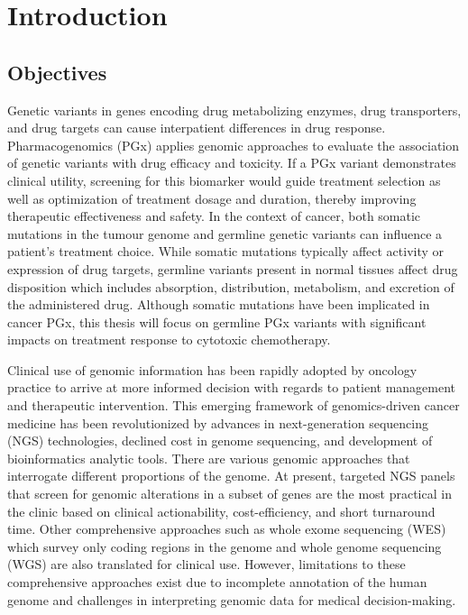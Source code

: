 
\chapter{Introduction}
\label{ch:Introduction}

\section{Objectives}
\label{sec:Objectives}

Genetic variants in genes encoding drug metabolizing enzymes, drug transporters, and drug targets can cause interpatient differences in drug response. Pharmacogenomics (PGx) applies genomic approaches to evaluate the association of genetic variants with drug efficacy and toxicity. If a PGx variant demonstrates clinical utility, screening for this biomarker would guide treatment selection as well as optimization of treatment dosage and duration, thereby improving therapeutic effectiveness and safety. In the context of cancer, both somatic mutations in the tumour genome and germline genetic variants can influence a patient's treatment choice. While somatic mutations typically affect activity or expression of drug targets, germline variants present in normal tissues affect drug disposition which includes absorption, distribution, metabolism, and excretion of the administered drug. Although somatic mutations have been implicated in cancer PGx, this thesis will focus on germline PGx variants with significant impacts on treatment response to cytotoxic chemotherapy.

Clinical use of genomic information has been rapidly adopted by oncology practice to arrive at more informed decision with regards to patient management and therapeutic intervention. This emerging framework of genomics-driven cancer medicine has been revolutionized by advances in next-generation sequencing (NGS) technologies, declined cost in genome sequencing, and development of bioinformatics analytic tools. There are various genomic approaches that interrogate different proportions of the genome. At present, targeted NGS panels that screen for genomic alterations in a subset of genes are the most practical in the clinic based on clinical actionability, cost-efficiency, and short turnaround time. Other comprehensive approaches such as whole exome sequencing (WES) which survey only coding regions in the genome and whole genome sequencing (WGS) are also translated for clinical use. However, limitations to these comprehensive approaches exist due to incomplete annotation of the human genome and challenges in interpreting genomic data for medical decision-making.

